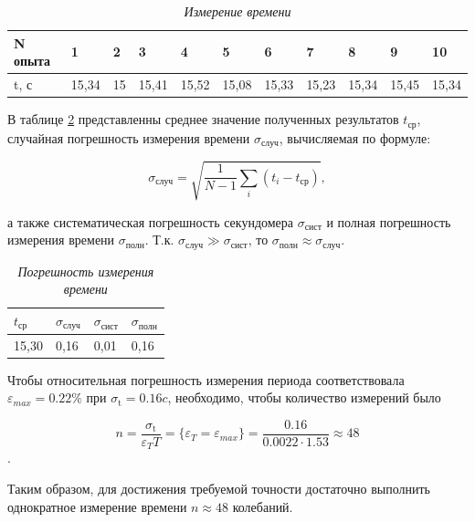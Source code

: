 \documentclass[a4paper,12pt]{article}
\begin{document}
\begin{table}[h]
\caption{\textit{Измерение времени}}
\label{izm_vremeni}
\begin{tabular}{|l|l|l|l|l|l|l|l|l|l|l|}
\hline
N опыта & 1     & 2  & 3     & 4     & 5     & 6     & 7     & 8     & 9     & 10    \\ \hline
t, с    & 15,34 & 15 & 15,41 & 15,52 & 15,08 & 15,33 & 15,23 & 15,34 & 15,45 & 15,34 \\ \hline
\end{tabular}
\end{table}

В таблице \ref{pogr_izm_vremeni} представленны среднее значение полученных результатов $t_{\text{ср}}$, случайная погрешность измерения времени $\sigma_{\text{случ}}$, вычисляемая по формуле:

\begin{equation}\label{sigma_sluch}
\sigma_{\text{случ}} = \sqrt{  \dfrac{1}{N-1} \sum_i(t_i - t_{\text{ср}}) },
\end{equation}

а также систематическая погрешность секундомера $\sigma_{\text{сист}}$ и полная погрешность измерения времени $\sigma_{\text{полн}}$. Т.к. $\sigma_{\text{случ}}  \gg \sigma_{\text{сист}}$, то $\sigma_{\text{полн}} \approx \sigma_{\text{случ}}$.

\begin{table}[]
\caption{\textit{Погрешность измерения времени}}
\label{pogr_izm_vremeni}
\begin{center}
\begin{tabular}{|l|l|l|l|}
\hline
$t_{\text{ср}}$   & $\sigma_{\text{случ}}$  & $\sigma_{\text{сист}}$  & $\sigma_{\text{полн}}$  \\ \hline
15,30 & 0,16 & 0,01 & 0,16 \\ \hline
\end{tabular}
\end{center}
\end{table}


Чтобы относительная погрешность измерения периода соответствовала $\varepsilon_{max} = 0.22 \%$ при $\sigma_{\text{t}} = 0.16 c$, необходимо, чтобы количество измерений было

\[ n = \dfrac{\sigma_{\text{t}}}{\varepsilon_{T} T} = \{\varepsilon_{T} = \varepsilon_{max}\} = \dfrac{0.16}{0.0022 \cdot 1.53} \approx 48 \].

Таким образом, для достижения требуемой точности достаточно выполнить однократное измерение времени $n \approx 48$ колебаний.
\end{document}
